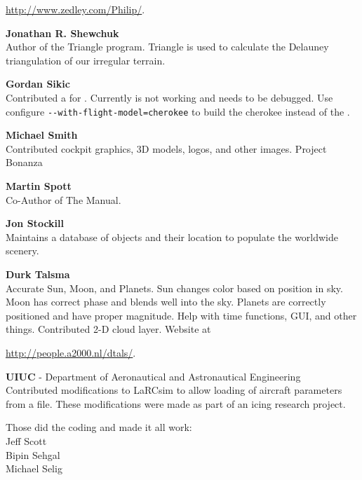   \href{http://www.zedley.com/Philip/}{http://www.zedley.com/Philip/}.
  \medskip

 \noindent \textbf{Jonathan R. Shewchuk}\\
  Author of the Triangle program.  Triangle
  is used to calculate the  Delauney triangulation of our irregular terrain.
 \medskip

\noindent \textbf{Gordan Sikic}\\
  Contributed a  for .  Currently is not
  working and needs to be debugged.  Use configure
  \texttt{-$ $-with-flight-model=cherokee}
  to build the cherokee instead of the .
 \medskip

\noindent \textbf{Michael Smith}\\
  Contributed cockpit graphics, 3D models, logos, and other images.
  Project Bonanza
   \medskip

\noindent \textbf{Martin Spott}\\
  Co-Author of The Manual.
  \medskip

\noindent \textbf{Jon Stockill}\\
  Maintains a database of objects and their location to populate the worldwide scenery.
\medskip

\noindent \textbf{Durk Talsma}\\
  Accurate Sun, Moon, and Planets.  Sun changes color based on
  position in sky. Moon has correct phase and blends well into the
  sky.  Planets are correctly positioned and have proper magnitude. Help with time
  functions, GUI, and other things. Contributed 2-D cloud layer. Website
  at
   \medskip

 \href{http://people.a2000.nl/dtals/}{http://people.a2000.nl/dtals/}.
 \medskip

\noindent \textbf{UIUC} - Department of Aeronautical and Astronautical
Engineering\\
  Contributed modifications to LaRCsim to allow loading of aircraft
  parameters from a file.  These modifications were made as part of an
  icing research project.
  \medskip

  Those did the coding and made it all work:\\
      Jeff Scott\\
      Bipin Sehgal\\
      Michael Selig
  \medskip

